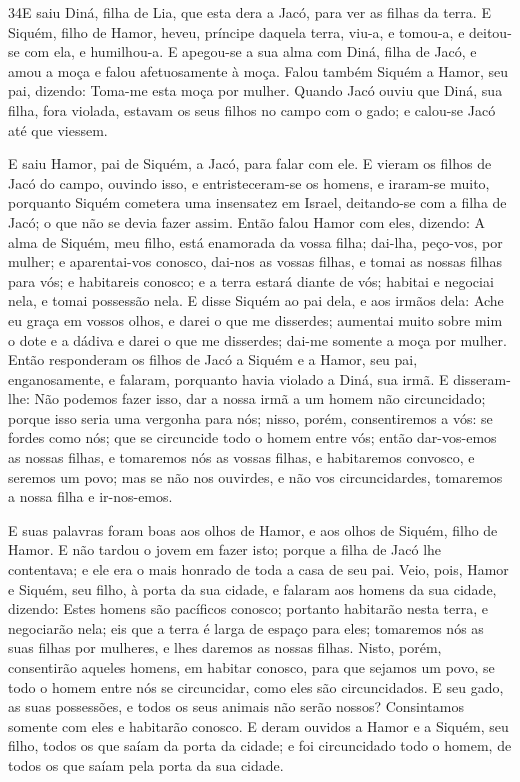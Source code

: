 \smallskip

\lettrine{34} E saiu Diná, filha de Lia, que esta dera a Jacó,
para ver as filhas da terra. E Siquém, filho de Hamor, heveu,
príncipe daquela terra, viu-a, e tomou-a, e deitou-se com ela, e
humilhou-a. E apegou-se a sua alma com Diná, filha de Jacó, e
amou a moça e falou afetuosamente à moça. Falou também Siquém a
Hamor, seu pai, dizendo: Toma-me esta moça por mulher. Quando
Jacó ouviu que Diná, sua filha, fora violada, estavam os seus filhos
no campo com o gado; e calou-se Jacó até que viessem.

E saiu Hamor, pai de Siquém, a Jacó, para falar com ele. E
vieram os filhos de Jacó do campo, ouvindo isso, e entristeceram-se
os homens, e iraram-se muito, porquanto Siquém cometera uma
insensatez em Israel, deitando-se com a filha de Jacó; o que não se
devia fazer assim. Então falou Hamor com eles, dizendo: A alma
de Siquém, meu filho, está enamorada da vossa filha; dai-lha,
peço-vos, por mulher; e aparentai-vos conosco, dai-nos as vossas
filhas, e tomai as nossas filhas para vós; e habitareis
conosco; e a terra estará diante de vós; habitai e negociai nela, e
tomai possessão nela. E disse Siquém ao pai dela, e aos
irmãos dela: Ache eu graça em vossos olhos, e darei o que me
disserdes; aumentai muito sobre mim o dote e a dádiva e darei
o que me disserdes; dai-me somente a moça por mulher. Então
responderam os filhos de Jacó a Siquém e a Hamor, seu pai,
enganosamente, e falaram, porquanto havia violado a Diná, sua irmã.
E disseram-lhe: Não podemos fazer isso, dar a nossa irmã a um
homem não circuncidado; porque isso seria uma vergonha para nós;
nisso, porém, consentiremos a vós: se fordes como nós; que se
circuncide todo o homem entre vós; então dar-vos-emos as
nossas filhas, e tomaremos nós as vossas filhas, e habitaremos
convosco, e seremos um povo; mas se não nos ouvirdes, e não
vos circuncidardes, tomaremos a nossa filha e ir-nos-emos.

E suas palavras foram boas aos olhos de Hamor, e aos olhos de
Siquém, filho de Hamor. E não tardou o jovem em fazer isto;
porque a filha de Jacó lhe contentava; e ele era o mais honrado de
toda a casa de seu pai. Veio, pois, Hamor e Siquém, seu
filho, à porta da sua cidade, e falaram aos homens da sua cidade,
dizendo: Estes homens são pacíficos conosco; portanto
habitarão nesta terra, e negociarão nela; eis que a terra é larga de
espaço para eles; tomaremos nós as suas filhas por mulheres, e lhes
daremos as nossas filhas. Nisto, porém, consentirão aqueles
homens, em habitar conosco, para que sejamos um povo, se todo o
homem entre nós se circuncidar, como eles são circuncidados.
E seu gado, as suas possessões, e todos os seus animais não
serão nossos? Consintamos somente com eles e habitarão conosco.
E deram ouvidos a Hamor e a Siquém, seu filho, todos os que
saíam da porta da cidade; e foi circuncidado todo o homem, de todos
os que saíam pela porta da sua cidade.

